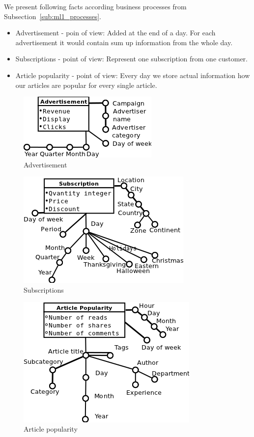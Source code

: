 
We present following facts according business processes from  Subsection~\ref{sub:ml1_processes}.
\begin{itemize}
    \item Advertisement - poin of view: Added at the end of a day. For each advertisement it would contain sum up information from the whole day.
    \item Subscriptions - point of view: Represent one subscription from one customer.
    \item Article popularity - point of view: Every day we store
    actual information how our articles are popular for every single article.
\end{itemize}

\begin{figure}[!hbp]
\begin{center}
  \includegraphics[scale=0.5]{fact_advertisement}
\caption{\label{pic:f_adv}  Advertisement}
\end{center}
\end{figure}

\begin{figure}[!hbp]
\begin{center}
    \includegraphics[scale=0.5]{fact_subscriptions}
\caption{\label{pic:f_sub}  Subscriptions}
\end{center}
\end{figure}

\begin{figure}[!hbp]
\begin{center}
  \includegraphics[scale=0.5]{fact_article}
\caption{\label{pic:f_art}  Article popularity}
\end{center}
\end{figure}

